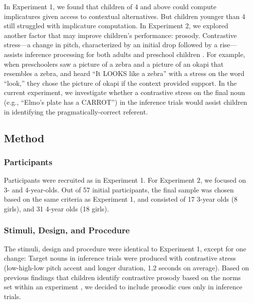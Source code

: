 \documentclass[10pt,letterpaper]{article}
\begin{document}
In Experiment 1, we found that children of 4 and above could compute implicatures given access to contextual alternatives. But children younger than 4 still struggled with implicature computation. In Experiment 2, we explored another factor that may improve children's performance: prosody. Contrastive stress---a change in pitch, characterized by an initial drop followed by a rise--- assists inference processing for both adults \cite{ito2008anticipatory} and preschool children \cite{kurumada1contextual}. For example, when preschoolers saw a picture of a zebra and a picture of an okapi that resembles a zebra, and heard ``It LOOKS like a zebra'' with a stress on the word ``look,'' they chose the picture of okapi if the context provided support. In the current experiment, we investigate whether a contrastive stress on the final noun (e.g., ``Elmo's plate has a CARROT'') in the inference trials would assist children in identifying the pragmatically-correct referent.

\subsection{Method}

\subsubsection{Participants}

Participants were recruited as in Experiment 1. For Experiment 2, we focused on 3- and 4-year-olds. Out of 57 initial participants, the final sample was chosen based on the same criteria as Experiment 1, and consisted of 17 3-year olds (8 girls), and 31 4-year olds (18 girls).

\subsubsection{Stimuli, Design, and Procedure}

The stimuli, design and procedure were identical to Experiment 1, except for one change: Target nouns in inference trials were produced with contrastive stress (low-high-low pitch accent and longer duration, 1.2 seconds on average). Based on previous findings that children identify contrastive prosody based on the norms set within an experiment \cite{kurumada1contextual}, we decided to include prosodic cues only in inference trials. 
\end{document}
